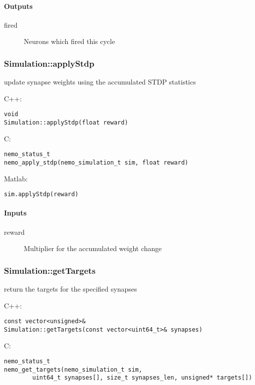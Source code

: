 \paragraph{Outputs}
\begin{description}
\item[fired] Neurons which fired this cycle
\end{description}

\clearpage
\subsubsection*{Simulation::applyStdp}
\label{fn: applyStdp}
update synapse weights using the accumulated STDP statistics


\noindent C++:
\begin{lstlisting}[aboveskip=2pt]
void
Simulation::applyStdp(float reward)
\end{lstlisting}

\noindent C:
\begin{lstlisting}[aboveskip=2pt]
nemo_status_t
nemo_apply_stdp(nemo_simulation_t sim, float reward)
\end{lstlisting}

\noindent Matlab:
\begin{lstlisting}[aboveskip=2pt]
sim.applyStdp(reward)
\end{lstlisting}
\paragraph{Inputs}
\begin{description}
\item[reward] Multiplier for the accumulated weight change
\end{description}

\clearpage
\subsubsection*{Simulation::getTargets}
\label{fn: getTargets}
return the targets for the specified synapses


\noindent C++:
\begin{lstlisting}[aboveskip=2pt]
const vector<unsigned>&
Simulation::getTargets(const vector<uint64_t>& synapses)
\end{lstlisting}

\noindent C:
\begin{lstlisting}[aboveskip=2pt]
nemo_status_t
nemo_get_targets(nemo_simulation_t sim, 
        uint64_t synapses[], size_t synapses_len, unsigned* targets[])
\end{lstlisting}

